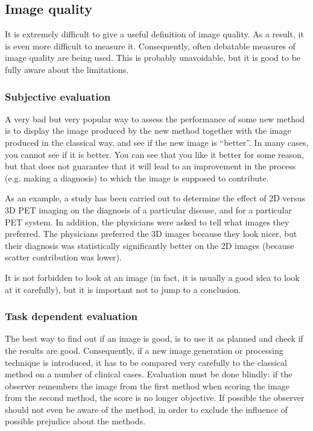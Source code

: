 \documentclass[11pt,oneside]{article}
\begin{document}
\subsection{Image quality}
It is extremely difficult to give a useful definition of image quality. As a
result, it is even more difficult to measure it. Consequently, often debatable
measures of image quality are being used. This is probably unavoidable, but it
is good to be fully aware about the limitations.

\subsubsection{Subjective evaluation}
A very bad but very popular way to assess the performance of some new method
is to display the image produced by the new method together with the image
produced in the classical way, and see if the new image is ``better''. In many
cases, you cannot see if it is better. You can see that you like it better for
some reason, but that does not guarantee that it will lead to an improvement
in the process (e.g. making a diagnosis) to which the image is supposed to
contribute.

As an example, a study has been carried out to determine the effect of
2D versus 3D PET imaging on the diagnosis of a particular disease, and
for a particular PET system. In addition, the physicians were asked to
tell what images they preferred. The physicians preferred the 3D
images because they look nicer, but their diagnosis was statistically
significantly better on the 2D images (because scatter contribution
was lower).

It is not forbidden to look at an image (in fact, it is usually a good
idea to look at it carefully), but it is important not to jump to a
conclusion.

\subsubsection{Task dependent evaluation}
The best way to find out if an image is good, is to use it as planned and
check if the results are good. Consequently, if a new image generation or
processing technique is introduced, it has to be compared very carefully to
the classical method on a number of clinical cases. Evaluation must be done
blindly: if the observer remembers the image from the first method when
scoring the image from the second method, the score is no longer objective. If
possible the observer should not even be aware of the method, in order to
exclude the influence of possible prejudice about the methods.
\end{document}
